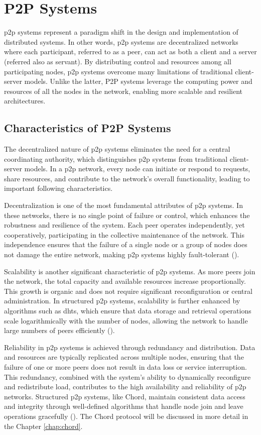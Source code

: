 \chapter{P2P Systems}\label{chap:p2p}
\gls{p2p} systems represent a paradigm shift in the design and implementation of distributed systems.
In other words, \gls{p2p} systems are decentralized networks where each participant, referred to as a peer, can act as both a client and a server (referred also as servant).
By distributing control and resources among all participating nodes, \gls{p2p} systems overcome many limitations of traditional client-server models.
Unlike the latter, P2P systems leverage the computing power and resources of all the nodes in the network, enabling more scalable and resilient architectures.

\section{Characteristics of P2P Systems}
The decentralized nature of \gls{p2p} systems eliminates the need for a central coordinating authority, which distinguishes \gls{p2p} systems from traditional client-server models.
In a \gls{p2p} network, every node can initiate or respond to requests, share resources, and contribute to the network's overall functionality, leading to important following characteristics.

Decentralization is one of the most fundamental attributes of \gls{p2p} systems.
In these networks, there is no single point of failure or control, which enhances the robustness and resilience of the system.
Each peer operates independently, yet cooperatively, participating in the collective maintenance of the network.
This independence ensures that the failure of a single node or a group of nodes does not damage the entire network, making \gls{p2p} systems highly fault-tolerant (\cite{singh2020}).

Scalability is another significant characteristic of \gls{p2p} systems.
As more peers join the network, the total capacity and available resources increase proportionally.
This growth is organic and does not require significant reconfiguration or central administration.
In structured \gls{p2p} systems, scalability is further enhanced by algorithms such as \glspl{dht}, which ensure that data storage and retrieval operations scale logarithmically with the number of nodes, allowing the network to handle large numbers of peers efficiently (\cite{singh2020}).

Reliability in \gls{p2p} systems is achieved through redundancy and distribution.
Data and resources are typically replicated across multiple nodes, ensuring that the failure of one or more peers does not result in data loss or service interruption.
This redundancy, combined with the system's ability to dynamically reconfigure and redistribute load, contributes to the high availability and reliability of \gls{p2p} networks.
Structured \gls{p2p} systems, like Chord, maintain consistent data access and integrity through well-defined algorithms that handle node join and leave operations gracefully (\cite{stoica2001,zarrin2017}).
The Chord protocol will be discussed in more detail in the Chapter \ref{chap:chord}.


